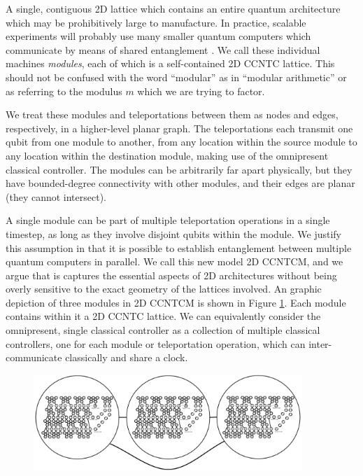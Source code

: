 \documentclass[twoside]{article}
\begin{document}
A single, contiguous
2D lattice which contains an entire quantum architecture which may be prohibitively large to manufacture. In practice,
scalable experiments will probably use many
smaller quantum computers which communicate by means of shared
entanglement \cite{Monroe2012}.
We call these individual machines \emph{modules}, each of
which is a self-contained \textsc{2D CCNTC} lattice. This should not be
confused with the word ``modular'' as in ``modular arithmetic'' or as
referring to the modulus $m$ which we are trying to factor.

We treat these modules
and teleportations between them as nodes and edges, respectively,
in a higher-level planar graph. The teleportations each transmit one qubit
from one module to another, from any location within the source module
to any location within the destination module, making use of the
omnipresent classical controller. The modules can be arbitrarily far
apart physically, but they have bounded-degree connectivity with other
modules, and their edges are planar (they cannot intersect).

A single module can be part of multiple teleportation operations in a single timestep, as long as they involve disjoint qubits within the module.
We justify this assumption in that it is
possible to establish entanglement between multiple
quantum computers
in parallel. We call this new model \textsc{2D CCNTCM},
and we argue that is captures the essential aspects of 2D architectures
without being overly sensitive to the exact geometry of the lattices involved.
An graphic depiction of three modules in \textsc{2D CCNTCM} is shown in
Figure \ref{fig:modules}. Each module contains within it a
\textsc{2D CCNTC} lattice. We can equivalently consider the omnipresent,
single
classical controller as a collection of multiple classical controllers, one
for each module or teleportation operation, which can inter-communicate
classically and share a clock.

\begin{figure}[btp!]
\begin{center}
\includegraphics[width=4in]{./modules.pdf}
\end{center}
\label{fig:modules}
\end{figure}
\end{document}
